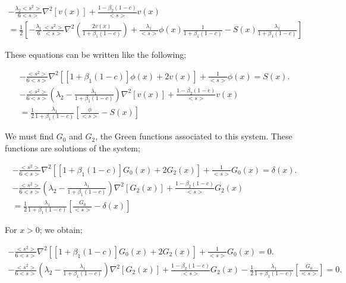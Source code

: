 \documentclass[a4paper, 12pt]{report}
\newcommand{\bl}{\big<}
\newcommand{\bg}{\big>}
\begin{document}
\begin{multline}
-\frac{\lambda_2 \bl s^2 \bg}{6\bl s \bg} \nabla^2 \left[v(x)\right] + \frac{1-\beta_2(1-c)}{\bl s \bg} v(x) \\= \frac{1}{2}\left[-\frac{\lambda_1}{6}\frac{\bl s^2 \bg}{\bl s \bg} \nabla^2\left(\frac{2v(x)}{1+\beta_1(1-c)}\right) + \frac{\lambda_1}{\bl s \bg}\phi(x)\frac{1}{1+\beta_1(1-c)}-S(x)\frac{\lambda_1}{1+\beta_1(1-c)}\right]
\end{multline}

These equations can be written like the following;

\begin{align}
-\frac{\bl s^2 \bg}{6\bl s \bg} \nabla^2 \left[\left[1+\beta_1(1-c)\right]\phi(x)+ 2v(x)\right] + \frac{1}{\bl s \bg} \phi(x) = S(x). \\
-\frac{\bl s^2 \bg}{6\bl s \bg}\left(\lambda_2 - \frac{\lambda_1}{1+\beta_1(1-c)}\right) \nabla^2 \left[v(x)\right] + \frac{1-\beta_2(1-c)}{\bl s \bg} v(x) \\= \frac{1}{2} \frac{\lambda_1}{1+\beta_1(1-c)}\left[\frac{\phi}{\bl s \bg} - S(x)\right]
\end{align}

We must find $G_0$ and $G_2$, the Green functions associated to this system. These functions are solutions of the system;

\begin{align}
-\frac{\bl s^2 \bg}{6\bl s \bg} \nabla^2 \left[\left[1+\beta_1(1-c)\right]G_0(x)+ 2G_2(x)\right] + \frac{1}{\bl s \bg}G_0(x) = \delta(x). \\
-\frac{\bl s^2 \bg}{6\bl s \bg}\left(\lambda_2 - \frac{\lambda_1}{1+\beta_1(1-c)}\right) \nabla^2 \left[G_2(x)\right] + \frac{1-\beta_2(1-c)}{\bl s \bg} G_2(x) \\= \frac{1}{2} \frac{\lambda_1}{1+\beta_1(1-c)}\left[\frac{G_0}{\bl s \bg} - \delta(x)\right]
\end{align}

For $x>0$; we obtain;

\begin{align}
-\frac{\bl s^2 \bg}{6\bl s \bg} \nabla^2 \left[\left[1+\beta_1(1-c)\right]G_0(x)+ 2G_2(x)\right] + \frac{1}{\bl s \bg}G_0(x) = 0. \\
-\frac{\bl s^2 \bg}{6\bl s \bg}\left(\lambda_2 - \frac{\lambda_1}{1+\beta_1(1-c)}\right) \nabla^2 \left[G_2(x)\right] + \frac{1-\beta_2(1-c)}{\bl s \bg} G_2(x) - \frac{1}{2} \frac{\lambda_1}{1+\beta_1(1-c)}\left[\frac{G_0}{\bl s \bg}\right] = 0.
\end{align}
\end{document}
